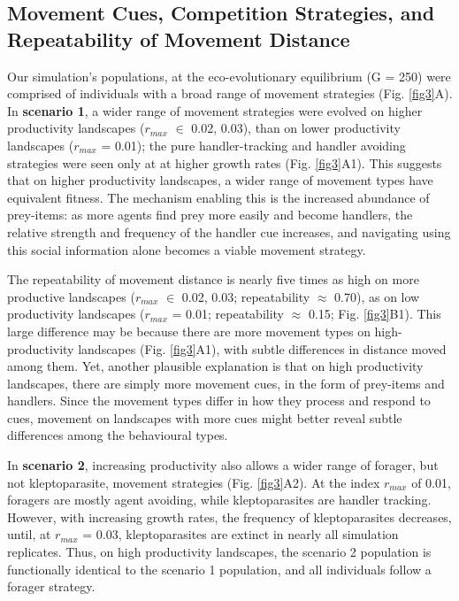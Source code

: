 \subsection*{Movement Cues, Competition Strategies, and Repeatability of Movement Distance}

Our simulation's populations, at the eco-evolutionary equilibrium (G = 250) were comprised of individuals with a broad range of movement strategies (Fig. \ref{fig3}A).
In \textbf{scenario 1}, a wider range of movement strategies were evolved on higher productivity landscapes ($r_{max}$ $\in$ 0.02, 0.03), than on lower productivity landscapes ($r_{max}$ = 0.01); the pure handler-tracking and handler avoiding strategies were seen only at at higher growth rates (Fig. \ref{fig3}A1).
This suggests that on higher productivity landscapes, a wider range of movement types have equivalent fitness.
The mechanism enabling this is the increased abundance of prey-items: as more agents find prey more easily and become handlers, the relative strength and frequency of the handler cue increases, and navigating using this social information alone becomes a viable movement strategy.

The repeatability of movement distance is nearly five times as high on more productive landscapes ($r_{max}$ $\in$ 0.02, 0.03; repeatability $\approx$ 0.70), as on low productivity landscapes ($r_{max}$ = 0.01; repeatability $\approx$ 0.15; Fig. \ref{fig3}B1).
This large difference may be because there are more movement types on high-productivity landscapes (Fig. \ref{fig3}A1), with subtle differences in distance moved among them.
Yet, another plausible explanation is that on high productivity landscapes, there are simply more movement cues, in the form of prey-items and handlers.
Since the movement types differ in how they process and respond to cues, movement on landscapes with more cues might better reveal subtle differences among the behavioural types.

In \textbf{scenario 2}, increasing productivity also allows a wider range of forager, but not kleptoparasite, movement strategies (Fig. \ref{fig3}A2).
At the index $r_{max}$ of 0.01, foragers are mostly agent avoiding, while kleptoparasites are handler tracking.
However, with increasing growth rates, the frequency of kleptoparasites decreases, until, at $r_{max}$ = 0.03, kleptoparasites are extinct in nearly all simulation replicates.
Thus, on high productivity landscapes, the scenario 2 population is functionally identical to the scenario 1 population, and all individuals follow a forager strategy.

